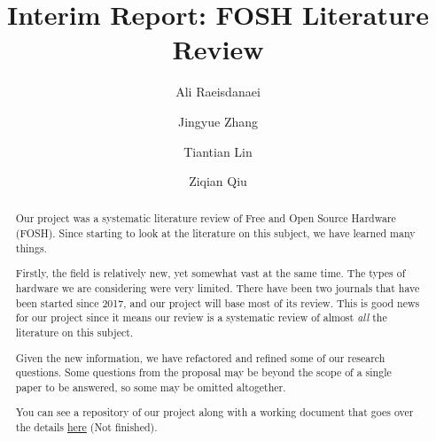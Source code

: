 \documentclass[acmtog]{acmart}
\begin{document}
\title{Interim Report: FOSH Literature Review}

\author{Ali Raeisdanaei}

\author{Jingyue Zhang}

\author{Tiantian Lin}

\author{Ziqian Qiu}


\begin{abstract}
Our project was a systematic literature review of Free and Open Source Hardware (FOSH).
Since starting to look at the literature on this subject, we have learned many things. 

Firstly, the field is relatively new, yet somewhat vast at the same time. 
The types of hardware we are considering were very limited.
There have been two journals that have been started since 2017, and our project will base most of its review. 
This is good news for our project since it means our review is a systematic review of almost \textit{all} the literature on this subject. 

Given the new information, we have refactored and refined some of our research questions. 
Some questions from the proposal may be beyond the scope of a single paper to be answered, so some may be omitted altogether. 

You can see a repository of our project along with a working document that goes over the details
\href{https://github.com/aliraeisdanaei/FOSH_Lit_Review/}{here}
(Not finished).
\end{abstract}
\end{document}

